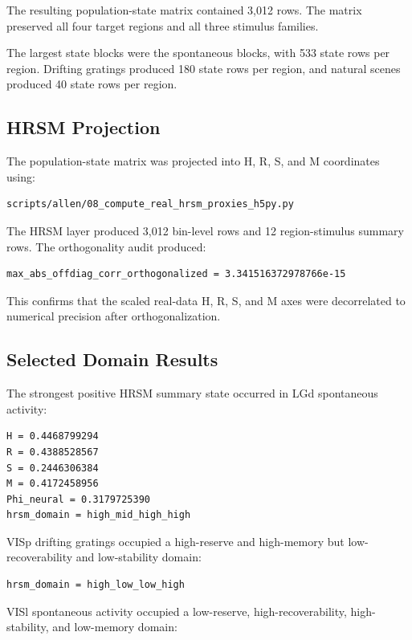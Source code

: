 The resulting population-state matrix contained 3,012 rows. The matrix preserved all four target regions and all three stimulus families.

The largest state blocks were the spontaneous blocks, with 533 state rows per region. Drifting gratings produced 180 state rows per region, and natural scenes produced 40 state rows per region.

\subsection{HRSM Projection}

The population-state matrix was projected into H, R, S, and M coordinates using:

\begin{verbatim}
scripts/allen/08_compute_real_hrsm_proxies_h5py.py
\end{verbatim}

The HRSM layer produced 3,012 bin-level rows and 12 region-stimulus summary rows. The orthogonality audit produced:

\begin{verbatim}
max_abs_offdiag_corr_orthogonalized = 3.341516372978766e-15
\end{verbatim}

This confirms that the scaled real-data H, R, S, and M axes were decorrelated to numerical precision after orthogonalization.

\subsection{Selected Domain Results}

The strongest positive HRSM summary state occurred in LGd spontaneous activity:

\begin{verbatim}
H = 0.4468799294
R = 0.4388528567
S = 0.2446306384
M = 0.4172458956
Phi_neural = 0.3179725390
hrsm_domain = high_mid_high_high
\end{verbatim}

VISp drifting gratings occupied a high-reserve and high-memory but low-recoverability and low-stability domain:

\begin{verbatim}
hrsm_domain = high_low_low_high
\end{verbatim}

VISl spontaneous activity occupied a low-reserve, high-recoverability, high-stability, and low-memory domain:

